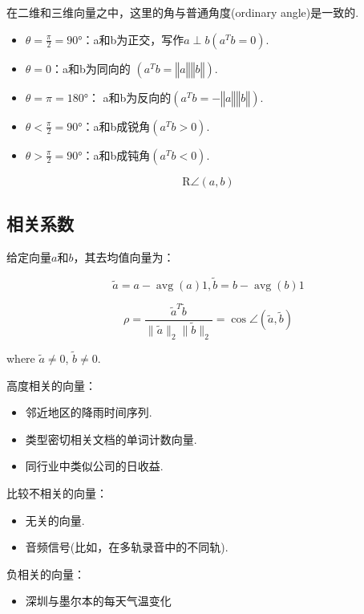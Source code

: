 在二维和三维向量之中，这里的角与普通角度(ordinary angle)是一致的. 

\begin{itemize}
    \item $\theta =\frac{\pi}{2}=90°$：a和b为正交，写作$a \perp b (a ^T b  =0)$. 
    \item $\theta =0$：a和b为同向的 $(a ^T  b=‖a ‖‖b  ‖)$. 
    \item $\theta =\pi =180°$： a和b为反向的$(a ^T   b  = - ‖a ‖‖b ‖)$. 
    \item $\theta <\frac{\pi}{2}=90°$：a和b成锐角$(a ^T b >0)$. 
    \item $\theta >\frac{\pi}{2}=90°$：a和b成钝角$(a ^T b <0)$. 
\end{itemize}

\begin{definition}[球面的距离]
    $$  \mathrm{R} \angle(a, b) $$
\end{definition}

\subsection{相关系数}

给定向量$a$和$b$，其去均值向量为：

$$ \tilde{a}=a-\operatorname{avg}(a) 1,  \tilde{b}=b-\operatorname{avg}(b) 1 $$

\begin{definition}[$a$和$b$的相关系数]
    $$ \rho=\frac{\tilde{a}^{T} \tilde{b}}{\|\tilde{a}\|_{2}\|\tilde{b}\|_{2}} = \cos \angle (\tilde{a}, \tilde{b}) $$

    where  $ \tilde{a} \neq 0 $,  $ \tilde{b} \neq 0 $.
\end{definition}

\begin{example}
    高度相关的向量：
\begin{itemize}
    \item 邻近地区的降雨时间序列. 
    \item 类型密切相关文档的单词计数向量. 
    \item 同行业中类似公司的日收益. 
\end{itemize}

比较不相关的向量：
\begin{itemize}
    \item 无关的向量. 
    \item 音频信号(比如，在多轨录音中的不同轨). 
\end{itemize}

负相关的向量：
\begin{itemize}
    \item 深圳与墨尔本的每天气温变化
\end{itemize}
\end{example}
